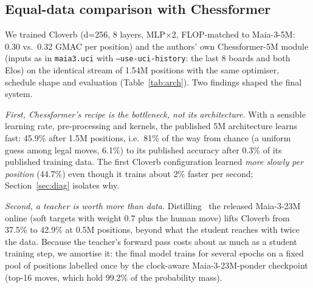 \subsection{Equal-data comparison with Chessformer}

We trained Cloverb (d=256, 8 layers, MLP$\times$2, FLOP-matched to Maia-3-5M: 0.30 vs.\ 0.32
GMAC per position) and the authors' own Chessformer-5M module (inputs as in \texttt{maia3.uci} with
\texttt{--use-uci-history}: the last 8 boards and both Elos) on the identical stream of 1.54M positions with the same optimiser, schedule
shape and evaluation (Table~\ref{tab:arch}). Two findings shaped the final system.

\emph{First, Chessformer's recipe is the bottleneck, not its architecture.} With a sensible
learning rate, pre-processing and kernels, the published 5M architecture learns fast:
45.9\% after 1.5M positions, i.e.\ 81\% of the way from chance (a uniform guess among legal moves,
6.1\%) to its published accuracy after 0.3\% of its published training data. The first Cloverb configuration learned \emph{more slowly
per position} (44.7\%) even though it trains about 2\% faster per second; Section~\ref{sec:diag}
isolates why.

\emph{Second, a teacher is worth more than data.} Distilling~\cite{hinton} the released Maia-3-23M online
(soft targets with weight 0.7 plus the human move) lifts Cloverb from 37.5\% to 42.9\% at 0.5M
positions, beyond what the student reaches with twice the data. Because the teacher's forward
pass costs about as much as a student training step, we amortise it: the final model trains for
several epochs on a fixed pool of positions labelled once by the clock-aware
Maia-3-23M-ponder checkpoint (top-16 moves, which hold 99.2\% of the probability mass).

